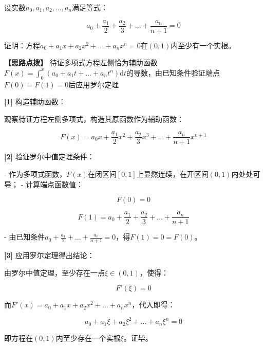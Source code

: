 \documentclass[11pt,a4paper,UTF8]{ctexart}
\begin{document}
设实数$a_0, a_1, a_2, \dots, a_n$满足等式：


\begin{equation*}
a_0 + \frac{a_1}{2} + \frac{a_2}{3} + \dots + \frac{a_n}{n+1} = 0
\end{equation*}

证明：方程$a_0 + a_1 x + a_2 x^2 + \dots + a_n x^n = 0$在$(0, 1)$内至少有一个实根。

\textbf{\color{DeepPurple}【思路点拨】} 待证多项式方程左侧恰为辅助函数$F(x) = \int_0^x (a_0 + a_1 t + \dots + a_n t^n)\mathrm{d}t$的导数，由已知条件验证端点$F(0) = F(1) = 0$后应用罗尔定理


\begin{solbox}[分步推导与答题规范]
\textbf{[1]} 构造辅助函数：

观察待证方程左侧多项式，构造其原函数作为辅助函数：


\begin{equation*}
F(x) = a_0 x + \frac{a_1}{2}x^2 + \frac{a_2}{3}x^3 + \dots + \frac{a_n}{n+1}x^{n+1}
\end{equation*}


\textbf{[2]} 验证罗尔中值定理条件：

- 作为多项式函数，$F(x)$在闭区间$[0, 1]$上显然连续，在开区间$(0, 1)$内处处可导；
- 计算端点函数值：


\begin{equation*}
F(0) = 0
\end{equation*}



\begin{equation*}
F(1) = a_0 + \frac{a_1}{2} + \frac{a_2}{3} + \dots + \frac{a_n}{n+1}
\end{equation*}


- 由已知条件$a_0 + \frac{a_1}{2} + \dots + \frac{a_n}{n+1} = 0$，得$F(1) = 0 = F(0)$。

\textbf{[3]} 应用罗尔定理得出结论：

由罗尔中值定理，至少存在一点$\xi \in (0, 1)$，使得：


\begin{equation*}
F'(\xi) = 0
\end{equation*}


而$F'(x) = a_0 + a_1 x + a_2 x^2 + \dots + a_n x^n$，代入即得：


\begin{equation*}
a_0 + a_1 \xi + a_2 \xi^2 + \dots + a_n \xi^n = 0
\end{equation*}


即方程在$(0, 1)$内至少存在一个实根$\xi$。证毕。
\end{solbox}
\end{document}
